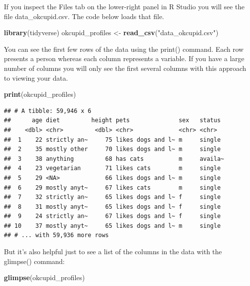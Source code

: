 \documentclass[
]{krantz}
\makeatletter
\newenvironment{Shaded}{\begin{snugshade}}{\end{snugshade}}
\newcommand{\KeywordTok}[1]{\textcolor[rgb]{0.27,0.27,0.27}{\textbf{#1}}}
\newcommand{\NormalTok}[1]{#1}
\newcommand{\StringTok}[1]{\textcolor[rgb]{0.5,0.5,0.5}{#1}}
\newenvironment{kframe}{%
\medskip{}
\setlength{\fboxsep}{.8em}
 \def\at@end@of@kframe{}%
 \ifinner\ifhmode%
  \def\at@end@of@kframe{\end{minipage}}%
  \begin{minipage}{\columnwidth}%
 \fi\fi%
 \def\FrameCommand##1{\hskip\@totalleftmargin \hskip-\fboxsep
 \colorbox{shadecolor}{##1}\hskip-\fboxsep
     \hskip-\linewidth \hskip-\@totalleftmargin \hskip\columnwidth}%
 \MakeFramed {\advance\hsize-\width
   \@totalleftmargin\z@ \linewidth\hsize
   \@setminipage}}%
 {\par\unskip\endMakeFramed%
 \at@end@of@kframe}
\renewenvironment{Shaded}{\begin{kframe}}{\end{kframe}}
\makeatother
\begin{document}
If you inspect the Files tab on the lower-right panel in R Studio you will see the file data\_okcupid.csv. The code below loads that file.

\begin{Shaded}
\begin{Highlighting}[]
\KeywordTok{library}\NormalTok{(tidyverse)}
\NormalTok{okcupid_profiles <-}\StringTok{ }\KeywordTok{read_csv}\NormalTok{(}\StringTok{"data_okcupid.csv"}\NormalTok{)}
\end{Highlighting}
\end{Shaded}

You can see the first few rows of the data using the print() command. Each row presents a person whereas each column represents a variable. If you have a large number of columns you will only see the first several columns with this approach to viewing your data.

\begin{Shaded}
\begin{Highlighting}[]
\KeywordTok{print}\NormalTok{(okcupid_profiles)}
\end{Highlighting}
\end{Shaded}

\begin{verbatim}
## # A tibble: 59,946 x 6
##      age diet         height pets              sex   status 
##    <dbl> <chr>         <dbl> <chr>             <chr> <chr>  
##  1    22 strictly an~     75 likes dogs and l~ m     single 
##  2    35 mostly other     70 likes dogs and l~ m     single 
##  3    38 anything         68 has cats          m     availa~
##  4    23 vegetarian       71 likes cats        m     single 
##  5    29 <NA>             66 likes dogs and l~ m     single 
##  6    29 mostly anyt~     67 likes cats        m     single 
##  7    32 strictly an~     65 likes dogs and l~ f     single 
##  8    31 mostly anyt~     65 likes dogs and l~ f     single 
##  9    24 strictly an~     67 likes dogs and l~ f     single 
## 10    37 mostly anyt~     65 likes dogs and l~ m     single 
## # ... with 59,936 more rows
\end{verbatim}

But it's also helpful just to see a list of the columns in the data with the glimpse() command:

\begin{Shaded}
\begin{Highlighting}[]
\KeywordTok{glimpse}\NormalTok{(okcupid_profiles)}
\end{Highlighting}
\end{Shaded}
\end{document}
